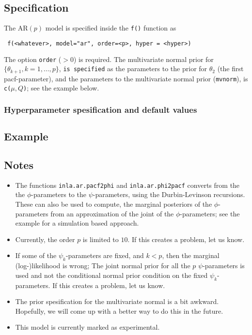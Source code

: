 \documentclass[a4paper,11pt]{article}
\begin{document}
\subsection*{Specification}

The AR$(p)$ model is specified inside the {\tt f()} function as
\begin{verbatim}
 f(<whatever>, model="ar", order=<p>, hyper = <hyper>)
\end{verbatim}
The option \texttt{order} ($>0$) is required. The multivariate normal
prior for $\{\theta_{k+1}, k=1, \ldots, p\}$, \texttt{is specified} as
the parameters to the prior for $\theta_{2}$ (the first
pacf-parameter), and the parameters to the multivariate normal prior
(\texttt{mvnorm}), is \texttt{c($\mu, Q$)}; see the example below.

\subsubsection*{Hyperparameter spesification and default values}


\subsection*{Example}



\subsection*{Notes}

\begin{itemize}
\item The functions \texttt{inla.ar.pacf2phi} and
    \texttt{inla.ar.phi2pacf} converts from the the $\phi$-parameters
    to the $\psi$-parameters, using the Durbin-Levinson
    recursions. These can also be used to compute, the marginal
    posteriors of the $\phi$-parameters from an approximation of the
    joint of the $\phi$-parameters; see the example for a simulation
    based approach.
\item Currently, the order $p$ is limited to $10$. If this creates a
    problem, let us know.
\item If some of the $\psi_{k}$-parameters are fixed, and $k < p$,
    then the marginal (log-)likelihood is wrong; The joint normal
    prior for all the $p$ $\psi$-parameters is used and not the
    conditional normal prior condition on the fixed
    $\psi_{k}$-parameters. If this creates a problem, let us know.
\item The prior spesification for the multivariate normal is a bit
    awkward. Hopefully, we will come up with a better way to do this
    in the future.
\item This model is currently marked as experimental.
\end{itemize}
\end{document}
